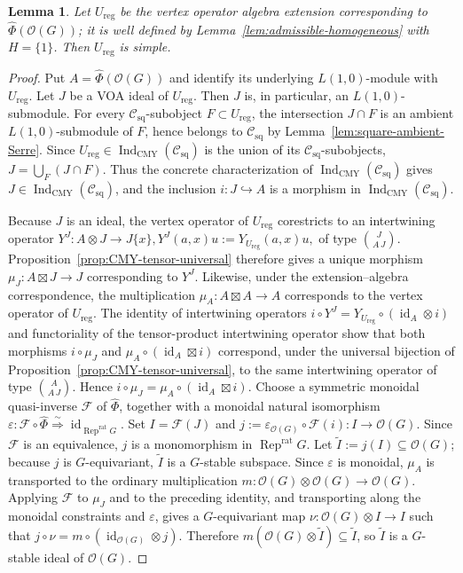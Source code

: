 \documentclass[12pt,leqno]{amsart}
\numberwithin{equation}{section} \newtheorem{thm}{Theorem}[section] \newtheorem{lem}[thm]{Lemma} \newtheorem{ex}[thm]{Example} \newtheorem{prop}[thm]{Proposition} \newtheorem{cor}[thm]{Corollary} \newtheorem{defi}[thm]{Definition} \newtheorem{rmk}[thm]{Remark} \newtheorem{notation}[thm]{Notation}
\newcommand{\id}{\operatorname{id}}
\newcommand{\Rep}{\operatorname{Rep}}
\newcommand{\OO}{\mathcal O}
\newcommand{\Csq}{\mathcal C_{\mathrm{sq}}}
\newcommand{\IndCMY}{\operatorname{Ind}_{\mathrm{CMY}}}
\begin{document}
\begin{lem}\label{lem:regular-simple}
Let $U_{\mathrm{reg}}$ be the vertex operator algebra extension corresponding to $\widehat\Phi(\OO(G))$; it is well defined by Lemma~\ref{lem:admissible-homogeneous} with $H=\{1\}$. Then $U_{\mathrm{reg}}$ is simple.
\end{lem}

\begin{proof}
Put $A=\widehat\Phi(\OO(G))$ and identify its underlying $L(1,0)$-module with $U_{\mathrm{reg}}$. Let $J$ be a VOA ideal of $U_{\mathrm{reg}}$. Then $J$ is, in particular, an $L(1,0)$-submodule. For every $\Csq$-subobject $F\subset U_{\mathrm{reg}}$, the intersection $J\cap F$ is an ambient $L(1,0)$-submodule of $F$, hence belongs to $\Csq$ by Lemma~\ref{lem:square-ambient-Serre}. Since $U_{\mathrm{reg}}\in\IndCMY(\Csq)$ is the union of its $\Csq$-subobjects, \(J=\bigcup_F(J\cap F).\) Thus the concrete characterization of $\IndCMY(\Csq)$ gives $J\in\IndCMY(\Csq)$, and the inclusion $i:J\hookrightarrow A$ is a morphism in $\IndCMY(\Csq)$.

Because $J$ is an ideal, the vertex operator of $U_{\mathrm{reg}}$ corestricts to an intertwining operator \(Y^J:A\otimes J\longrightarrow J\{x\},Y^J(a,x)u:=Y_{U_{\mathrm{reg}}}(a,x)u,\) of type $\binom{J}{A\,J}$. Proposition~\ref{prop:CMY-tensor-universal} therefore gives a unique morphism \(\mu_J:A\boxtimes J\to J\) corresponding to $Y^J$. Likewise, under the extension--algebra correspondence, the multiplication $\mu_A:A\boxtimes A\to A$ corresponds to the vertex operator of $U_{\mathrm{reg}}$. The identity of intertwining operators \(i\circ Y^J=Y_{U_{\mathrm{reg}}}\circ(\id_A\otimes i)\) and functoriality of the tensor-product intertwining operator show that both morphisms \(i\circ\mu_J\) and \(\mu_A\circ(\id_A\boxtimes i)\) correspond, under the universal bijection of Proposition~\ref{prop:CMY-tensor-universal}, to the same intertwining operator of type $\binom{A}{A\,J}$. Hence \(i\circ\mu_J=\mu_A\circ(\id_A\boxtimes i).\) Choose a symmetric monoidal quasi-inverse $\mathcal F$ of $\widehat\Phi$, together with a monoidal natural isomorphism \(\varepsilon:\mathcal F\circ\widehat\Phi \overset{\sim}{\Longrightarrow}\id_{\Rep^{\mathrm{rat}}G}\). Set \(I=\mathcal F(J)\) and \(j:=\varepsilon_{\OO(G)}\circ\mathcal F(i):I\longrightarrow\OO(G).\) Since $\mathcal F$ is an equivalence, $j$ is a monomorphism in $\Rep^{\mathrm{rat}}G$. Let \(\widetilde I:=j(I)\subseteq\OO(G)\); because $j$ is $G$-equivariant, $\widetilde I$ is a $G$-stable subspace. Since $\varepsilon$ is monoidal, $\mu_A$ is transported to the ordinary multiplication $m:\OO(G)\otimes\OO(G)\to\OO(G)$. Applying $\mathcal F$ to $\mu_J$ and to the preceding identity, and transporting along the monoidal constraints and $\varepsilon$, gives a $G$-equivariant map \(\nu:\OO(G)\otimes I\to I\) such that \(j\circ\nu=m\circ(\id_{\OO(G)}\otimes j).\) Therefore \(m(\OO(G)\otimes\widetilde I)\subseteq\widetilde I\), so $\widetilde I$ is a $G$-stable ideal of $\OO(G)$.


\end{proof}
\end{document}
